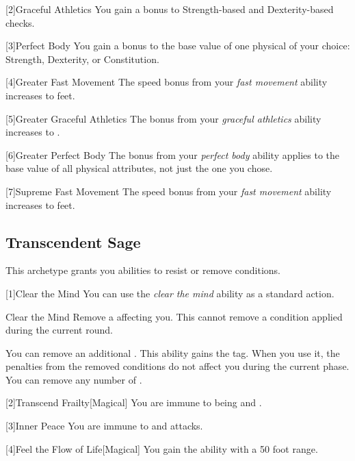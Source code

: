         [2]{Graceful Athletics} You gain a  bonus to Strength-based and Dexterity-based checks.

        [3]{Perfect Body} You gain a  bonus to the base value of one physical  of your choice: Strength, Dexterity, or Constitution.

        [4]{Greater Fast Movement} The speed bonus from your \textit{fast movement} ability increases to  feet.

        [5]{Greater Graceful Athletics} The bonus from your \textit{graceful athletics} ability increases to .

        [6]{Greater Perfect Body} The bonus from your \textit{perfect body} ability applies to the base value of all physical attributes, not just the one you chose.

        [7]{Supreme Fast Movement} The speed bonus from your \textit{fast movement} ability increases to  feet.

    \subsection{Transcendent Sage}
        This archetype grants you abilities to resist or remove conditions.

        [1]{Clear the Mind} You can use the \textit{clear the mind} ability as a standard action.
        \begin{freeability}{Clear the Mind}
            Remove a  affecting you.
            This cannot remove a condition applied during the current round.

            \rankline
             You can remove an additional .
             This ability gains the  tag.
            When you use it, the penalties from the removed conditions do not affect you during the current phase.
             You can remove any number of .
        \end{freeability}

        [2]{Transcend Frailty}[Magical]
        You are immune to being  and .

        [3]{Inner Peace} You are immune to  and  attacks.

        [4]{Feel the Flow of Life}[Magical] You gain the  ability with a 50 foot range.

